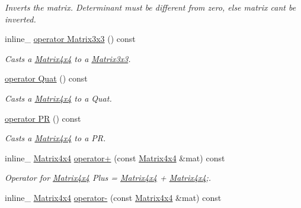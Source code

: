 \begin{DoxyCompactItemize}
\begin{DoxyCompactList}\small\item\em Inverts the matrix. Determinant must be different from zero, else matrix can\textquotesingle{}t be inverted. \end{DoxyCompactList}\item 
inline\+\_\+ \hyperlink{classMatrix4x4_a0d7fc2502933e85a83490f07c1ea1be5}{operator Matrix3x3} () const \hypertarget{classMatrix4x4_a0d7fc2502933e85a83490f07c1ea1be5}{}\label{classMatrix4x4_a0d7fc2502933e85a83490f07c1ea1be5}

\begin{DoxyCompactList}\small\item\em Casts a \hyperlink{classMatrix4x4}{Matrix4x4} to a \hyperlink{classMatrix3x3}{Matrix3x3}. \end{DoxyCompactList}\item 
\hyperlink{classMatrix4x4_a1dde2efce6464424b72d9f1dc44d26d2}{operator Quat} () const \hypertarget{classMatrix4x4_a1dde2efce6464424b72d9f1dc44d26d2}{}\label{classMatrix4x4_a1dde2efce6464424b72d9f1dc44d26d2}

\begin{DoxyCompactList}\small\item\em Casts a \hyperlink{classMatrix4x4}{Matrix4x4} to a Quat. \end{DoxyCompactList}\item 
\hyperlink{classMatrix4x4_a37307ac629fbb3b670d54adf5edb0c2b}{operator PR} () const \hypertarget{classMatrix4x4_a37307ac629fbb3b670d54adf5edb0c2b}{}\label{classMatrix4x4_a37307ac629fbb3b670d54adf5edb0c2b}

\begin{DoxyCompactList}\small\item\em Casts a \hyperlink{classMatrix4x4}{Matrix4x4} to a PR. \end{DoxyCompactList}\item 
inline\+\_\+ \hyperlink{classMatrix4x4}{Matrix4x4} \hyperlink{classMatrix4x4_a8dbb55175843512fed26857e5aedbb95}{operator+} (const \hyperlink{classMatrix4x4}{Matrix4x4} \&mat) const \hypertarget{classMatrix4x4_a8dbb55175843512fed26857e5aedbb95}{}\label{classMatrix4x4_a8dbb55175843512fed26857e5aedbb95}

\begin{DoxyCompactList}\small\item\em Operator for \hyperlink{classMatrix4x4}{Matrix4x4} Plus = \hyperlink{classMatrix4x4}{Matrix4x4} + \hyperlink{classMatrix4x4}{Matrix4x4};. \end{DoxyCompactList}\item 
inline\+\_\+ \hyperlink{classMatrix4x4}{Matrix4x4} \hyperlink{classMatrix4x4_a196ef375611a481f1f5ce644d87aae28}{operator-\/} (const \hyperlink{classMatrix4x4}{Matrix4x4} \&mat) const \hypertarget{classMatrix4x4_a196ef375611a481f1f5ce644d87aae28}{}\label{classMatrix4x4_a196ef375611a481f1f5ce644d87aae28}


\end{DoxyCompactItemize}
